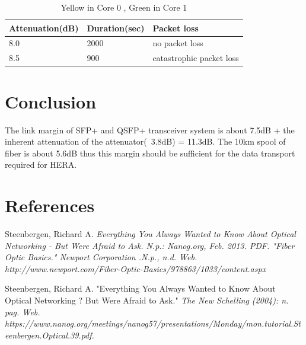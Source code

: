 \documentclass{article}
\begin{document}
{\begin{table}[ht]
\begin{minipage}{.5\textwidth}
\end{minipage}
\begin{minipage}{.5\textwidth}
\begin{center}
\begin{tabular}{|p{2.5cm}|p{2.5cm}|p{2.5cm}|}
	\hline
	 Attenuation(dB) & Duration(sec) & Packet loss \\ \hline
	 8.0  &  2000 & no packet loss \\ \hline
	 8.5  & 900 & catastrophic packet loss \\ \hline
\end{tabular}
\end{center}
\caption{Yellow in Core 0 , Green in Core 1}
\label{table:yellowcore0}
\end{minipage}
\end{table}
}

\section*{Conclusion}
The link margin of SFP+ and QSFP+ transceiver system is about 7.5dB + the inherent attenuation of the attenuator(~3.8dB) = 11.3dB. The 10km spool of fiber is about 5.6dB thus this margin should be sufficient for the data transport required for HERA. 

\section*{References}
Steenbergen, Richard A. \it{Everything You Always Wanted to Know About Optical Networking - But Were Afraid to Ask}. N.p.: Nanog.org, Feb. 2013. PDF.
"Fiber Optic Basics."  \it {Newport Corporation} .N.p., n.d. Web. http://www.newport.com/Fiber-Optic-Basics/978863/1033/content.aspx

Steenbergen, Richard A. "Everything You Always Wanted to Know About Optical Networking ? But Were Afraid to Ask." \it{The New Schelling} (2004): n. pag. Web. https://www.nanog.org/meetings/nanog57/presentations/Monday/mon.tutorial.Steenbergen.Optical.39.pdf.
\end{document}
